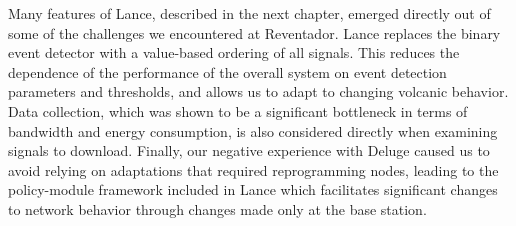 Many features of Lance, described in the next chapter, emerged directly out
of some of the challenges we encountered at Reventador. Lance replaces the
binary event detector with a value-based ordering of all signals. This
reduces the dependence of the performance of the overall system on event
detection parameters and thresholds, and allows us to adapt to changing
volcanic behavior. Data collection, which was shown to be a significant
bottleneck in terms of bandwidth and energy consumption, is also considered
directly when examining signals to download. Finally, our negative experience
with Deluge caused us to avoid relying on adaptations that required
reprogramming nodes, leading to the policy-module framework included in Lance
which facilitates significant changes to network behavior through changes
made only at the base station.
